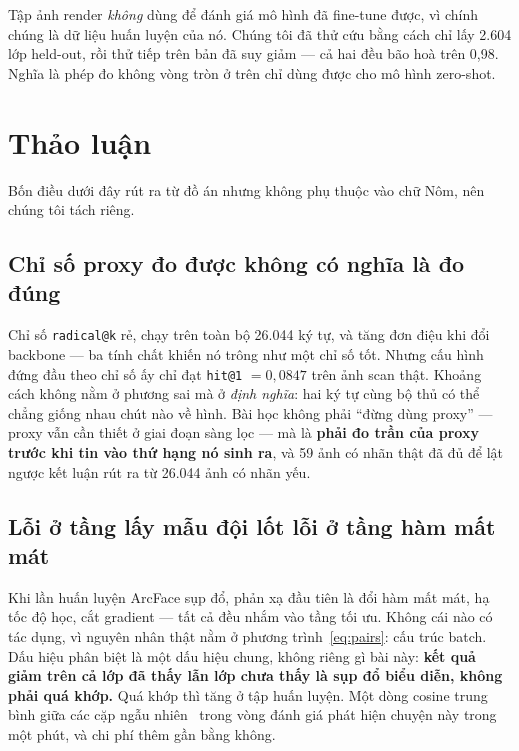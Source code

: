 \documentclass[conference,a4paper]{IEEEtran}
\newcommand{\code}[1]{{\small\texttt{#1}}}
\begin{document}
Tập ảnh render \emph{không} dùng để đánh giá mô hình đã fine-tune được, vì chính chúng là dữ liệu
huấn luyện của nó. Chúng tôi đã thử cứu bằng cách chỉ lấy 2.604 lớp held-out, rồi thử tiếp trên bản
đã suy giảm --- cả hai đều bão hoà trên 0,98. Nghĩa là phép đo không vòng tròn ở trên chỉ dùng được
cho mô hình zero-shot.

\section{Thảo luận}
\label{sec:discuss}

Bốn điều dưới đây rút ra từ đồ án nhưng không phụ thuộc vào chữ Nôm, nên chúng tôi tách riêng.

\subsection{Chỉ số proxy đo được không có nghĩa là đo đúng}

Chỉ số \code{radical@k} rẻ, chạy trên toàn bộ 26.044 ký tự, và tăng đơn điệu khi đổi backbone --- ba
tính chất khiến nó trông như một chỉ số tốt. Nhưng cấu hình đứng đầu theo chỉ số ấy chỉ đạt
\code{hit@1} $= 0{,}0847$ trên ảnh scan thật. Khoảng cách không nằm ở phương sai mà ở
\emph{định nghĩa}: hai ký tự cùng bộ thủ có thể chẳng giống nhau chút nào về hình. Bài học không phải
``đừng dùng proxy'' --- proxy vẫn cần thiết ở giai đoạn sàng lọc --- mà là \textbf{phải đo trần của
proxy trước khi tin vào thứ hạng nó sinh ra}, và 59 ảnh có nhãn thật đã đủ để lật ngược kết luận rút
ra từ 26.044 ảnh có nhãn yếu.

\subsection{Lỗi ở tầng lấy mẫu đội lốt lỗi ở tầng hàm mất mát}

Khi lần huấn luyện ArcFace sụp đổ, phản xạ đầu tiên là đổi hàm mất mát, hạ tốc độ học, cắt gradient
--- tất cả đều nhắm vào tầng tối ưu. Không cái nào có tác dụng, vì nguyên nhân thật nằm ở
phương trình~\eqref{eq:pairs}: cấu trúc batch. Dấu hiệu phân biệt là một dấu hiệu chung, không riêng
gì bài này: \textbf{kết quả giảm trên cả lớp đã thấy lẫn lớp chưa thấy là sụp đổ biểu diễn, không
phải quá khớp.} Quá khớp thì tăng ở tập huấn luyện. Một dòng cosine trung bình giữa các cặp ngẫu
nhiên~\cite{alignuniform} trong vòng đánh giá phát hiện chuyện này trong một phút, và chi phí thêm
gần bằng không.
\end{document}
